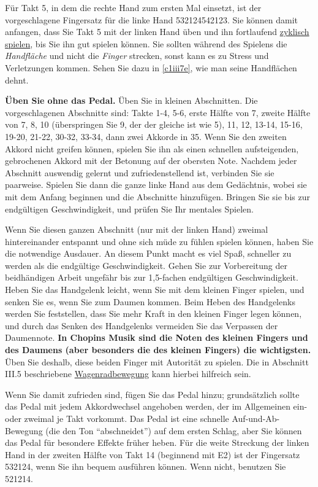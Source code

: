 Für Takt 5, in dem die rechte Hand zum ersten Mal einsetzt, ist der vorgeschlagene Fingersatz für die linke Hand 532124542123.
Sie können damit anfangen, dass Sie Takt 5 mit der linken Hand üben und ihn fortlaufend \hyperref[c1iii2]{zyklisch spielen}, bis Sie ihn gut spielen können.
Sie sollten während des Spielens die \textit{Handfläche} und nicht die \textit{Finger} strecken, sonst kann es zu Stress und Verletzungen kommen.
Sehen Sie dazu in \hyperref[c1iii7e]{\autoref{c1iii7e}}, wie man seine Handflächen dehnt.

\textbf{Üben Sie ohne das Pedal.}
Üben Sie in kleinen Abschnitten.
Die vorgeschlagenen Abschnitte sind: Takte 1-4, 5-6, erste Hälfte von 7, zweite Hälfte von 7, 8, 10 (überspringen Sie 9, der der gleiche ist wie 5), 11, 12, 13-14, 15-16, 19-20, 21-22, 30-32, 33-34, dann zwei Akkorde in 35.
Wenn Sie den zweiten Akkord nicht greifen können, spielen Sie ihn als einen schnellen aufsteigenden, gebrochenen Akkord mit der Betonung auf der obersten Note.
Nachdem jeder Abschnitt auswendig gelernt und zufriedenstellend ist, verbinden Sie sie paarweise.
Spielen Sie dann die ganze linke Hand aus dem Gedächtnis, wobei sie mit dem Anfang beginnen und die Abschnitte hinzufügen.
Bringen Sie sie bis zur endgültigen Geschwindigkeit, und prüfen Sie Ihr mentales Spielen.

Wenn Sie diesen ganzen Abschnitt (nur mit der linken Hand) zweimal hintereinander entspannt und ohne sich müde zu fühlen spielen können, haben Sie die notwendige Ausdauer.
An diesem Punkt macht es viel Spaß, schneller zu werden als die endgültige Geschwindigkeit.
Gehen Sie zur Vorbereitung der beidhändigen Arbeit ungefähr bis zur 1,5-fachen endgültigen Geschwindigkeit.
Heben Sie das Handgelenk leicht, wenn Sie mit dem kleinen Finger spielen, und senken Sie es, wenn Sie zum Daumen kommen.
Beim Heben des Handgelenks werden Sie feststellen, dass Sie mehr Kraft in den kleinen Finger legen können, und durch das Senken des Handgelenks vermeiden Sie das Verpassen der Daumennote.
\textbf{In Chopins Musik sind die Noten des kleinen Fingers und des Daumens (aber besonders die des kleinen Fingers) die wichtigsten.}
Üben Sie deshalb, diese beiden Finger mit Autorität zu spielen.
Die in Abschnitt III.5 beschriebene \hyperref[c1iii5wagen]{Wagenradbewegung} kann hierbei hilfreich sein.

Wenn Sie damit zufrieden sind, fügen Sie das Pedal hinzu; grundsätzlich sollte das Pedal mit jedem Akkordwechsel angehoben werden, der im Allgemeinen ein- oder zweimal je Takt vorkommt.
Das Pedal ist eine schnelle Auf-und-Ab-Bewegung (die den Ton \enquote{abschneidet}) auf dem ersten Schlag, aber Sie können das Pedal für besondere Effekte früher heben.
Für die weite Streckung der linken Hand in der zweiten Hälfte von Takt 14 (beginnend mit E2) ist der Fingersatz 532124, wenn Sie ihn bequem ausführen können.
Wenn nicht, benutzen Sie 521214.

